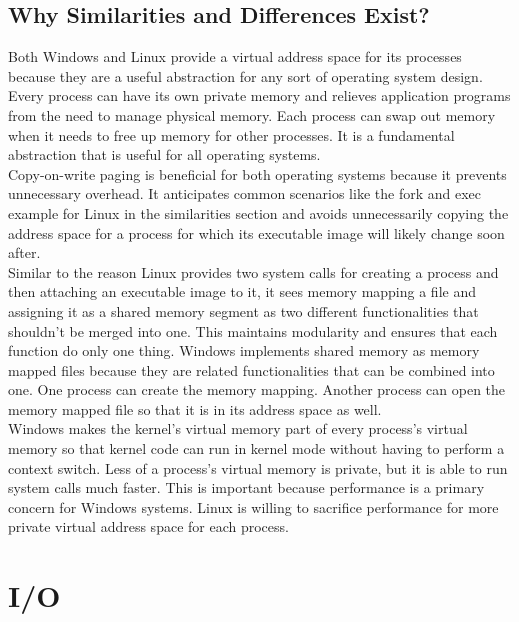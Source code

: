 \documentclass[letterpaper,10pt,titlepage]{article}
\begin{document}
\subsection{Why Similarities and Differences Exist?}
Both Windows and Linux provide a virtual address space for its processes
because they are a useful abstraction for any sort of operating system 
design. Every process can have its own private memory and relieves application
programs from the need to manage physical memory. Each process can swap out
memory when it needs to free up memory for other processes. It is a fundamental
abstraction that is useful for all operating systems.
\\
\linebreak
Copy-on-write paging is beneficial for both operating systems because it 
prevents unnecessary overhead. It anticipates common scenarios like the fork
and exec example for Linux in the similarities section and avoids 
unnecessarily copying the address space for a process for which its 
executable image will likely change soon after.
\\
\linebreak
Similar to the reason Linux provides two system calls for creating a process 
and then attaching an executable image to it, it sees memory mapping a file 
and assigning it as a shared memory segment as two different functionalities
that shouldn't be merged into one. This maintains modularity and ensures that
each function do only one thing. Windows implements shared memory as memory 
mapped files because they are related functionalities that can be combined 
into one. One process can create the memory mapping. Another process can
open the memory mapped file so that it is in its address space as well. 
\\
\linebreak
Windows makes the kernel's virtual memory part of every process's virtual 
memory so that kernel code can run in kernel mode without having to perform a 
context switch. Less of a process's virtual memory is private, but it is able
to run system calls much faster. This is important because performance is a 
primary concern for Windows systems. Linux is willing to sacrifice performance
for more private virtual address space for each process.
\section{I/O}
\end{document}
